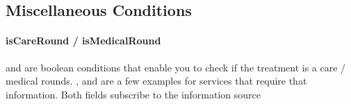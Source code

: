 \subsection{Miscellaneous Conditions}\label{subsec:miscellaneous-conditions}

\paragraph{isCareRound / isMedicalRound}
 and  are boolean conditions that enable you to check if the treatment is a care / medical rounds.
,  and  are a few examples for services that require that information.
Both fields subscribe to the information source 


